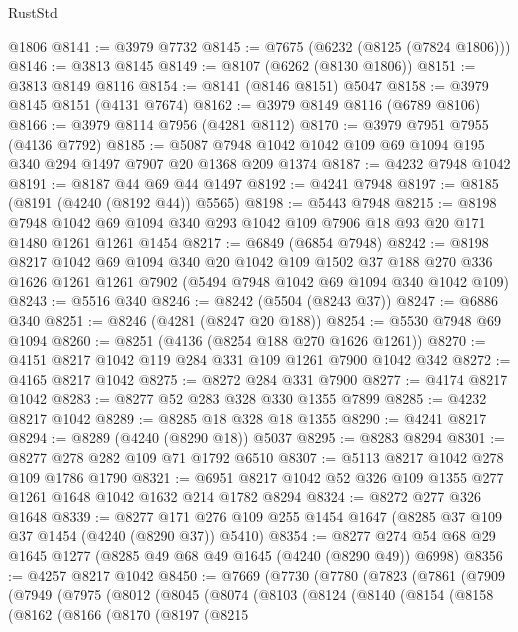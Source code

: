 \begin{lexlean}{RustStd}
\begin{coremodule}
{\begin{coremodule}
{{{{{{{{{{{{{{{{{{{{{{{{{{{{{{{{{{{    @1806
@8141 := @3979 @7732
@8145 := @7675 (@6232 (@8125 (@7824 @1806)))
@8146 := @3813 @8145
@8149 := @8107 (@6262 (@8130 @1806))
@8151 := @3813 @8149 @8116
@8154 := @8141 (@8146 @8151) @5047
@8158 := @3979 @8145 @8151 (@4131 @7674)
@8162 := @3979 @8149 @8116 (@6789 @8106)
@8166 := @3979 @8114 @7956 (@4281 @8112)
@8170 := @3979 @7951 @7955 (@4136 @7792)
@8185 := @5087 @7948 @1042 @1042 @109 @69 @1094 @195 @340 @294 @1497 @7907 @20 @1368 @209 @1374
@8187 := @4232 @7948 @1042
@8191 := @8187 @44 @69 @44 @1497
@8192 := @4241 @7948
@8197 := @8185 (@8191 (@4240 (@8192 @44)) @5565)
@8198 := @5443 @7948
@8215 := @8198
    @7948
    @1042
    @69
    @1094
    @340
    @293
    @1042
    @109
    @7906
    @18
    @93
    @20
    @171
    @1480
    @1261
    @1261
    @1454
@8217 := @6849 (@6854 @7948)
@8242 := @8198
    @8217
    @1042
    @69
    @1094
    @340
    @20
    @1042
    @109
    @1502
    @37
    @188
    @270
    @336
    @1626
    @1261
    @1261
    @7902
    (@5494 @7948 @1042 @69 @1094 @340 @1042 @109)
@8243 := @5516 @340
@8246 := @8242 (@5504 (@8243 @37))
@8247 := @6886 @340
@8251 := @8246 (@4281 (@8247 @20 @188))
@8254 := @5530 @7948 @69 @1094
@8260 := @8251 (@4136 (@8254 @188 @270 @1626 @1261))
@8270 := @4151 @8217 @1042 @119 @284 @331 @109 @1261 @7900 @1042 @342
@8272 := @4165 @8217 @1042
@8275 := @8272 @284 @331 @7900
@8277 := @4174 @8217 @1042
@8283 := @8277 @52 @283 @328 @330 @1355 @7899
@8285 := @4232 @8217 @1042
@8289 := @8285 @18 @328 @18 @1355
@8290 := @4241 @8217
@8294 := @8289 (@4240 (@8290 @18)) @5037
@8295 := @8283 @8294
@8301 := @8277 @278 @282 @109 @71 @1792 @6510
@8307 := @5113 @8217 @1042 @278 @109 @1786 @1790
@8321 := @6951 @8217 @1042 @52 @326 @109 @1355 @277 @1261 @1648 @1042 @1632 @214 @1782 @8294
@8324 := @8272 @277 @326 @1648
@8339 := @8277 @171 @276 @109 @255 @1454 @1647 (@8285 @37 @109 @37 @1454 (@4240 (@8290 @37)) @5410)
@8354 := @8277 @274 @54 @68 @29 @1645 @1277 (@8285 @49 @68 @49 @1645 (@4240 (@8290 @49)) @6998)
@8356 := @4257 @8217 @1042
@8450 := @7669
    (@7730
      (@7780
        (@7823
          (@7861
            (@7909
              (@7949
                (@7975
                  (@8012
                    (@8045
                      (@8074
                        (@8103
                          (@8124
                            (@8140
                              (@8154
                                (@8158
                                  (@8162
                                    (@8166
                                      (@8170
                                        (@8197
                                          (@8215
}}}}}}}}}}}}}}}}}}}}}}}}}}}}}}}}}}}
\end{coremodule}}
\end{coremodule}
\end{lexlean}
